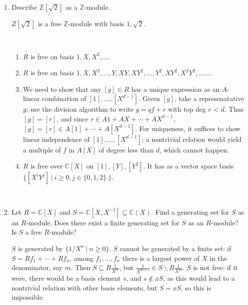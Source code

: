\documentclass[12pt]{amsart}
\newcommand{\Bold}[1]{\contour{black}{#1}}
\newcommand{\Z}{\mathbb{Z}}
\newcommand{\C}{\mathbb{C}}
\newcommand{\solution}[1]{\ifthenelse {\equal{\displaysol}{1}} {\begin{framed}{\color{meretale}\noindent #1}\end{framed}} { \ }}
\newcommand\itemA{\stepcounter{enumi}\item[{\Bold{(\theenumi)}}]}
\newcommand\itema{\stepcounter{enumii}\item[{\Bold{(\theenumii)}}]}
\begin{document}
\begin{enumerate}
\

\itemA Describe $\Z[\sqrt{2}]$ as a $\Z$-module.

\solution{$Z[\sqrt{2}]$ is a free $\Z$-module with basis $1,\sqrt{2}$.}

\solution{
\begin{enumerate}
\itema $R$ is free on basis $1, X, X^2, \dots$.
\itema $R$ is free on basis $1, X, X^2, \dots, Y, XY, XY^2, \dots, Y^2, XY^2, X^2Y^2, \dots \dots$.
\itema We need to show that any $[g] \in R$ has a unique expression as an $A$-linear combination of $[1],\dots,[X^{d-1}]$. Given $[g]$, take a represenatative $g$; use the division algorithm to write $g=qf+r$ with top deg $r$ < $d$. Thus $[g] = [r]$, and since $r\in A 1 + A X + \cdots + A X^{d-1}$, $[g]=[r] \in A[1] + \cdots+ A[X^{d-1}]$. For uniqueness, it suffices to show linear independence of $[1],\dots,[X^{d-1}]$; a nontrivial relation would yield a multiple of $f$ in $A[X]$ of degree less than $d$, which cannot happen.
\itema $R$ is free over $\C[X]$ on $[1], [Y], [Y^2]$. It has as a vector space basis ${\{ [X^i Y^j] \ | \ i\geq 0, j\in\{0,1,2\}.\}}$.
\end{enumerate}}

\itemA Let $R=\C[X]$ and $S=\C[X,X^{-1}] \subseteq \C(X)$. Find a generating set for $S$ as an $R$-module. Does there exist a finite generating set for $S$ as an $R$-module? Is $S$ a free $R$-module?

\solution{$S$ is generated by $\{ 1/X^n \ | \ n\geq 0\}$. $S$ cannot be generated by a finite set: if ${S=R f_1 + \cdots + Rf_n}$, among $f_1,\dots,f_n$ there is a largest power of $X$ in the denominator, say $m$. Then $S\subseteq R \frac{1}{X^m}$, but $\frac{1}{X^{m+1}}\in S \smallsetminus R \frac{1}{X^m}$. $S$ is not free: if it were, there would be a basis element $s$, and $s\notin xS$, as this would lead to a nontrivial relation with other basis elements, but $S=xS$, so this is impossible.}



\end{enumerate}
\end{document}
